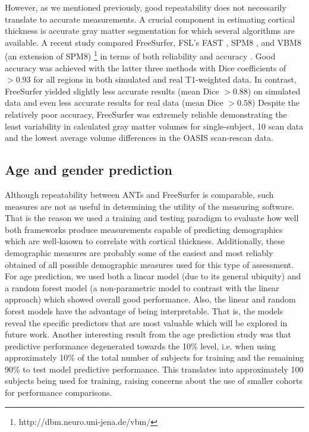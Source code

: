 However, as we mentioned previously, good repeatability
does not necessarily translate to accurate measurements.  
A crucial component in estimating cortical thickness is accurate
gray matter segmentation for which several algorithms are available.
A recent study compared FreeSurfer, FSL's FAST \citep{zhang2001},
SPM8 \citep{ashburner2005}, and VBM8 (an extension of SPM8)%
\footnote{
http://dbm.neuro.uni-jena.de/vbm/
}
in terms of both reliability and accuracy \cite{eggert2012}.  
Good accuracy was achieved with the latter three methods with 
Dice coefficients of $>0.93$ for all regions 
in both simulated and real T1-weighted data.  In contrast, FreeSurfer
yielded slightly less accurate results  (mean Dice $> 0.88$) on simulated 
data and even less accurate results for real data (mean Dice $> 0.58$)
Despite the relatively poor accuracy, FreeSurfer was extremely reliable
demonstrating the least variability in calculated gray matter volumes 
for single-subject, 10 scan data and the lowest average volume
differences in the OASIS scan-rescan data.

\subsection{Age and gender prediction} 
Although repeatability between ANTs and FreeSurfer is comparable,
such measures are not as useful in determining the utility of the 
measuring software.  That is the reason we used 
a training and testing paradigm to evaluate how well both frameworks produce measurements capable of predicting demographics which are well-known to correlate
with cortical thickness.  Additionally, these demographic measures are
probably some of the easiest and most reliably obtained of all possible
demographic measures used for this type of assessment.  For age prediction,
we used both a linear model (due to its general ubiquity) and a random
forest model (a non-parametric model to contrast with the linear approach)
which showed overall good performance.  Also, the linear  and
random forest models have the advantage of being
interpretable.  That is, the models reveal the specific predictors
that are most valuable which will be explored in future work.  
Another interesting result from the age prediction study was that 
predictive performance degenerated towards the 10\% level, i.e. 
when using approximately 10\% of the total number of subjects for 
training and the remaining 90\% to test model predictive performance.
This translates into approximately 100 subjects being used for training,
raising concerns about the use of smaller cohorts for performance comparisons.

